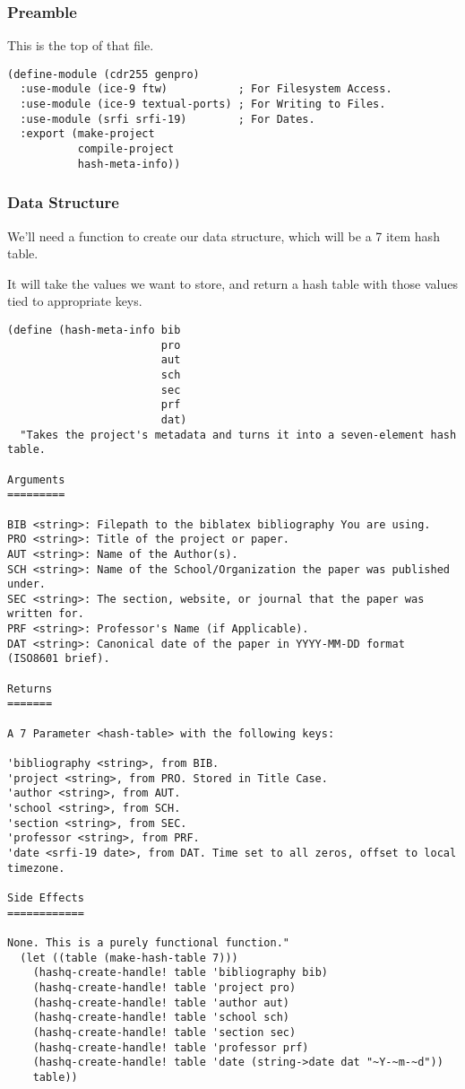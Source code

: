\documentclass[11pt]{article}
\begin{document}
\subsubsection{Preamble}
\label{sec:org3ca0102}
This is the top of that file.

\begin{verbatim}
(define-module (cdr255 genpro)
  :use-module (ice-9 ftw)           ; For Filesystem Access.
  :use-module (ice-9 textual-ports) ; For Writing to Files.
  :use-module (srfi srfi-19)        ; For Dates.
  :export (make-project
           compile-project
           hash-meta-info))
\end{verbatim}
\subsubsection{Data Structure}
\label{sec:orgb707f76}
We'll need a function to create our data structure, which will be a 7 item hash
table.

It will take the values we want to store, and return a hash table with those
values tied to appropriate keys.
\begin{verbatim}
(define (hash-meta-info bib
                        pro
                        aut
                        sch
                        sec
                        prf
                        dat)
  "Takes the project's metadata and turns it into a seven-element hash table.

Arguments
=========

BIB <string>: Filepath to the biblatex bibliography You are using.
PRO <string>: Title of the project or paper.
AUT <string>: Name of the Author(s).
SCH <string>: Name of the School/Organization the paper was published under.
SEC <string>: The section, website, or journal that the paper was written for.
PRF <string>: Professor's Name (if Applicable).
DAT <string>: Canonical date of the paper in YYYY-MM-DD format (ISO8601 brief).

Returns
=======

A 7 Parameter <hash-table> with the following keys: 

'bibliography <string>, from BIB. 
'project <string>, from PRO. Stored in Title Case.
'author <string>, from AUT.
'school <string>, from SCH.
'section <string>, from SEC.
'professor <string>, from PRF.
'date <srfi-19 date>, from DAT. Time set to all zeros, offset to local timezone.

Side Effects
============

None. This is a purely functional function."
  (let ((table (make-hash-table 7)))
    (hashq-create-handle! table 'bibliography bib)
    (hashq-create-handle! table 'project pro)
    (hashq-create-handle! table 'author aut)
    (hashq-create-handle! table 'school sch)
    (hashq-create-handle! table 'section sec)
    (hashq-create-handle! table 'professor prf)
    (hashq-create-handle! table 'date (string->date dat "~Y-~m-~d"))
    table))
\end{verbatim}
\end{document}
